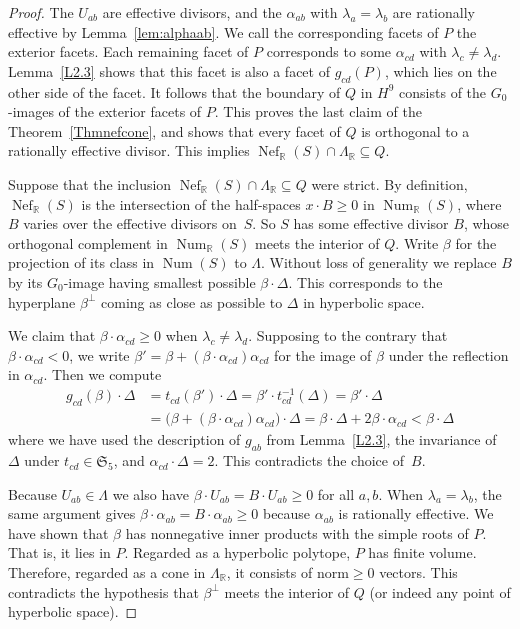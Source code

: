 \documentclass[11pt]{article}
\theoremstyle{definition}
\numberwithin{equation}{section}
\numberwithin{figure}{section}
\numberwithin{table}{section}
\newcommand*\R{\mathbb{R}}
\newcommand{\bbR}{{\mathbb{R}}}
\DeclareMathOperator{\Nef}{Nef}
\DeclareMathOperator{\Num}{Num}
\newcommand{\frakS}{\mathfrak{S}}
\begin{document}
\begin{proof}
The $U_{ab}$ are effective divisors, and the $\alpha_{ab}$ with $\lambda_a=\lambda_b$ are rationally effective by Lemma~\ref{lem:alphaab}. We call the corresponding facets of $P$ the exterior facets. Each remaining facet of $P$ corresponds to some $\alpha_{cd}$ with $\lambda_c\neq\lambda_d$. Lemma~\ref{L2.3} shows that this facet is also a facet of $g_{cd}(P)$, which lies on the other side of the facet. It follows that the boundary of $Q$ in $H^9$ consists of the $G_0$-images of the exterior facets of $P$. This proves the last claim of the Theorem~\ref{Thmnefcone}, and shows that every facet of $Q$ is orthogonal to a rationally effective divisor. This implies $\Nef_\R(S)\cap\Lambda_\R\subseteq Q$.

Suppose that the inclusion $\Nef_\R(S)\cap\Lambda_\R\subseteq Q$ were strict. By definition, $\Nef_\bbR(S)$ is the intersection of the half-spaces $x\cdot B\geq0$ in $\Num_\bbR(S)$, where $B$ varies over the effective divisors on~$S$. So $S$ has some effective divisor $B$, whose orthogonal complement in $\Num_\R(S)$ meets the interior of $Q$. Write $\beta$ for the projection of its class in $\Num(S)$ to $\Lambda$. Without loss of generality we replace $B$ by its $G_0$-image having smallest possible $\beta\cdot\Delta$. This corresponds to the hyperplane $\beta^\perp$ coming as close as possible to $\Delta$ in hyperbolic space.

We claim that $\beta\cdot\alpha_{cd}\geq0$ when $\lambda_c\neq\lambda_d$. Supposing to the contrary that $\beta\cdot\alpha_{cd}<0$, we write $\beta'=\beta+(\beta\cdot\alpha_{cd})\alpha_{cd}$ for the image of $\beta$ under the reflection in $\alpha_{cd}$. Then we compute
\begin{align*}
g_{cd}(\beta)\cdot\Delta &{}= t_{cd}(\beta')\cdot\Delta =
\beta'\cdot t_{cd}^{-1}(\Delta) =
\beta'\cdot\Delta
\\
{}&=
\bigl(\beta+(\beta\cdot\alpha_{cd})\alpha_{cd}\bigr)\cdot\Delta =
\beta\cdot\Delta+2\beta\cdot\alpha_{cd} <\beta\cdot\Delta
\end{align*}
where we have used the description of $g_{ab}$ from Lemma~\ref{L2.3}, the invariance of $\Delta$ under $t_{cd}\in\frakS_5$, and $\alpha_{cd}\cdot\Delta=2$. This contradicts the choice of~$B$.

Because $U_{ab}\in\Lambda$ we also have $\beta\cdot U_{ab}=B\cdot U_{ab}\geq0$ for all $a,b$. When $\lambda_a=\lambda_b$, the same argument gives $\beta\cdot\alpha_{ab}=B\cdot\alpha_{ab}\geq0$ because $\alpha_{ab}$ is rationally effective. We have shown that $\beta$ has nonnegative inner products with the simple roots of $P$. That is, it lies in $P$. Regarded as a hyperbolic polytope, $P$ has finite volume. Therefore, regarded as a cone in $\Lambda_\bbR$, it consists of norm${ }\geq0$ vectors. This contradicts the hypothesis that $\beta^\perp$ meets the interior of $Q$ (or indeed any point of hyperbolic space).
\end{proof}
\end{document}
